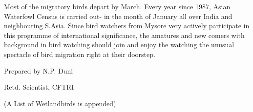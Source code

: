Most of the migratory birds depart by March. Every year
since 1987, Asian Waterfowl Census is carried out- in the 
month of January all over India and neighbouring S.Asia. 
Since bird watchers from Mysore very actively participate in 
this programme of international significance, the amatures 
and new comers with background in bird watching should join 
and enjoy the watching the unusual spectacle of bird 
migration right at their doorstep. 

\vskip 1cm

\bigskip

\hfill{Prepared by N.P. Duni \qquad ~}

\smallskip
\hfill{Retd. Scientist, CFTRI \qquad ~}

\smallskip
\hfill{(A List of Wetlandbirds is appended) }
